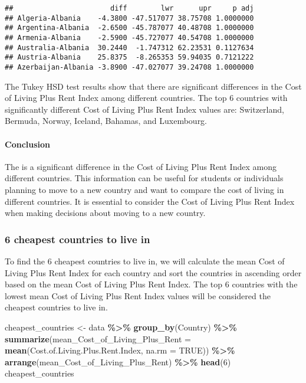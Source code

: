\documentclass[
]{article}
\newenvironment{Shaded}{\begin{snugshade}}{\end{snugshade}}
\newcommand{\AttributeTok}[1]{\textcolor[rgb]{0.13,0.29,0.53}{#1}}
\newcommand{\ConstantTok}[1]{\textcolor[rgb]{0.56,0.35,0.01}{#1}}
\newcommand{\DecValTok}[1]{\textcolor[rgb]{0.00,0.00,0.81}{#1}}
\newcommand{\FunctionTok}[1]{\textcolor[rgb]{0.13,0.29,0.53}{\textbf{#1}}}
\newcommand{\NormalTok}[1]{#1}
\newcommand{\OtherTok}[1]{\textcolor[rgb]{0.56,0.35,0.01}{#1}}
\newcommand{\SpecialCharTok}[1]{\textcolor[rgb]{0.81,0.36,0.00}{\textbf{#1}}}
\begin{document}
\begin{verbatim}
##                       diff        lwr      upr     p adj
## Algeria-Albania    -4.3800 -47.517077 38.75708 1.0000000
## Argentina-Albania  -2.6500 -45.787077 40.48708 1.0000000
## Armenia-Albania    -2.5900 -45.727077 40.54708 1.0000000
## Australia-Albania  30.2440  -1.747312 62.23531 0.1127634
## Austria-Albania    25.8375  -8.265353 59.94035 0.7121222
## Azerbaijan-Albania -3.8900 -47.027077 39.24708 1.0000000
\end{verbatim}

The Tukey HSD test results show that there are significant differences
in the Cost of Living Plus Rent Index among different countries. The top
6 countries with significantly different Cost of Living Plus Rent Index
values are: Switzerland, Bermuda, Norway, Iceland, Bahamas, and
Luxembourg.

\paragraph{Conclusion}\label{conclusion-1}

The is a significant difference in the Cost of Living Plus Rent Index
among different countries. This information can be useful for students
or individuals planning to move to a new country and want to compare the
cost of living in different countries. It is essential to consider the
Cost of Living Plus Rent Index when making decisions about moving to a
new country.

\subsubsection{6 cheapest countries to live
in}\label{cheapest-countries-to-live-in}

To find the 6 cheapest countries to live in, we will calculate the mean
Cost of Living Plus Rent Index for each country and sort the countries
in ascending order based on the mean Cost of Living Plus Rent Index. The
top 6 countries with the lowest mean Cost of Living Plus Rent Index
values will be considered the cheapest countries to live in.

\begin{Shaded}
\begin{Highlighting}[]
\NormalTok{cheapest\_countries }\OtherTok{\textless{}{-}}\NormalTok{ data }\SpecialCharTok{\%\textgreater{}\%}
  \FunctionTok{group\_by}\NormalTok{(Country) }\SpecialCharTok{\%\textgreater{}\%}
  \FunctionTok{summarize}\NormalTok{(}\AttributeTok{mean\_Cost\_of\_Living\_Plus\_Rent =} \FunctionTok{mean}\NormalTok{(Cost.of.Living.Plus.Rent.Index, }\AttributeTok{na.rm =} \ConstantTok{TRUE}\NormalTok{)) }\SpecialCharTok{\%\textgreater{}\%}
  \FunctionTok{arrange}\NormalTok{(mean\_Cost\_of\_Living\_Plus\_Rent) }\SpecialCharTok{\%\textgreater{}\%}
  \FunctionTok{head}\NormalTok{(}\DecValTok{6}\NormalTok{) }
\NormalTok{cheapest\_countries}
\end{Highlighting}
\end{Shaded}
\end{document}
